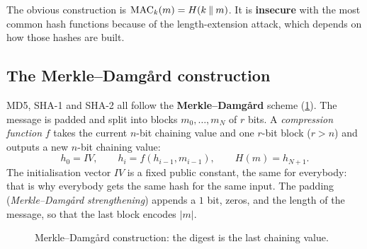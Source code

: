 The obvious construction is $\operatorname{MAC}_k(m) = H(k \mathbin{\|} m)$. It is \textbf{insecure} with the most common hash functions because of the length-extension attack, which depends on how those hashes are built.

\subsection{The Merkle--Damgård construction}

MD5, SHA-1 and SHA-2 all follow the \textbf{Merkle--Damgård} scheme (\cref{fig:merkle-damgard}). The message is padded and split into blocks $m_0, \dots, m_N$ of $r$ bits. A \emph{compression function} $f$ takes the current $n$-bit chaining value and one $r$-bit block ($r > n$) and outputs a new $n$-bit chaining value:
\[
    h_0 = IV, \qquad h_{i} = f(h_{i-1}, m_{i-1}), \qquad H(m) = h_{N+1}.
\]
The initialisation vector $IV$ is a fixed public constant, the same for everybody: that is why everybody gets the same hash for the same input. The padding (\emph{Merkle--Damgård strengthening}) appends a $1$ bit, zeros, and the length of the message, so that the last block encodes $|m|$.

\begin{figure}[H]
\centering
{}
\caption{Merkle--Damgård construction: the digest is the last chaining value.}
\label{fig:merkle-damgard}
\end{figure}

